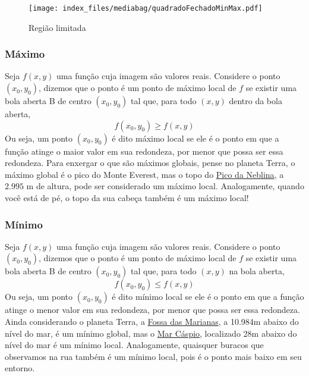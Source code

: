 \documentclass[
  portuguese,
  letterpaper,
  DIV=11,
  numbers=noendperiod]{scrreport}
\begin{document}
\begin{figure}[H]

\caption{Região limitada}

{\centering \texttt{[image: index\_files/mediabag/quadradoFechadoMinMax.pdf]}

}

\end{figure}%

\subsubsection{Máximo}\label{muxe1ximo-1}

Seja \(f(x,y)\) uma função cuja imagem são valores reais. Considere o
ponto \((x_0, y_0)\), dizemos que o ponto é um ponto de máximo local de
\(f\) se existir uma bola aberta B de centro \((x_0, y_0)\) tal que,
para todo \((x,y)\) dentro da bola aberta, \[
f(x_0,y_0) \geq f(x,y)
\] Ou seja, um ponto \((x_0, y_0)\) é dito máximo local se ele é o ponto
em que a função atinge o maior valor em sua redondeza, por menor que
possa ser essa redondeza. Para enxergar o que são máximos globais, pense
no planeta Terra, o máximo global é o pico do Monte Everest, mas o topo
do \href{https://pt.wikipedia.org/wiki/Pico_da_Neblina}{Pico da
Neblina}, a \(2.995\) m de altura, pode ser considerado um máximo local.
Analogamente, quando você está de pé, o topo da sua cabeça também é um
máximo local!

\subsubsection{Mínimo}\label{muxednimo-1}

Seja \(f(x,y)\) uma função cuja imagem são valores reais. Considere o
ponto \((x_0, y_0)\), dizemos que o ponto é um ponto de máximo local de
\(f\) se existir uma bola aberta B de centro \((x_0, y_0)\) tal que,
para todo \((x,y)\) na bola aberta, \[
f(x_0,y_0) \leq f(x,y)
\] Ou seja, um ponto \((x_0, y_0)\) é dito mínimo local se ele é o ponto
em que a função atinge o menor valor em sua redondeza, por menor que
possa ser essa redondeza. Ainda considerando o planeta Terra, a
\href{https://pt.wikipedia.org/wiki/Fossa_das_Marianas}{Fossa das
Marianas}, a 10.984m abaixo do nível do mar, é um mínimo global, mas o
\href{https://pt.wikipedia.org/wiki/Mar_Cáspio}{Mar Cáspio}, localizado
28m abaixo do nível do mar é um mínimo local. Analogamente, quaisquer
buracos que observamos na rua também é um mínimo local, pois é o ponto
mais baixo em seu entorno.
\end{document}
